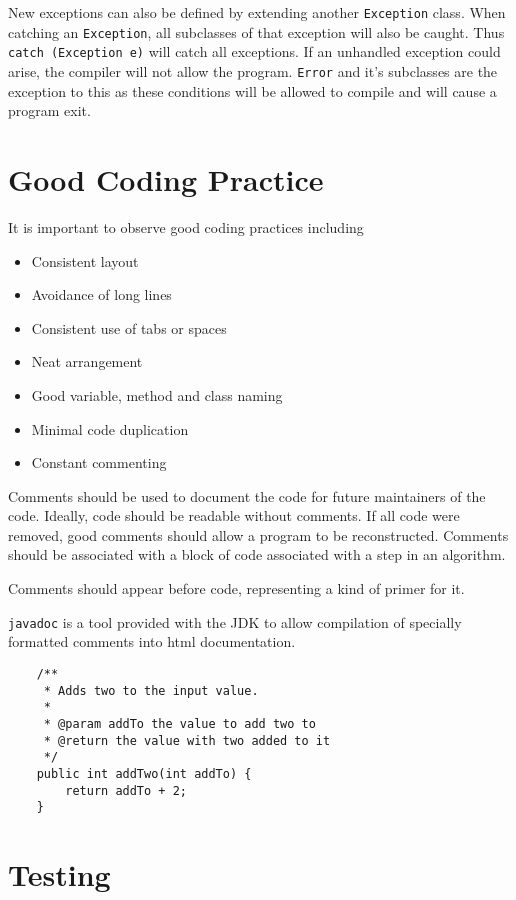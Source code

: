 \documentclass[12pt]{report}
\newcommand{\code}[1]{\lstinline{#1}}
\begin{document}
\begin{flushleft}
New exceptions can also be defined by extending another \code{Exception} class.
When catching an \code{Exception}, all subclasses of that exception will also
be caught. Thus \code{catch (Exception e)} will catch all exceptions. If an
unhandled exception could arise, the compiler will not allow the program.
\code{Error} and it's subclasses are the exception to this as these conditions
will be allowed to compile and will cause a program exit.

\section*{Good Coding Practice}

It is important to observe good coding practices including

\begin{itemize}
    \item Consistent layout
    \item Avoidance of long lines
    \item Consistent use of tabs or spaces
    \item Neat arrangement
    \item Good variable, method and class naming
    \item Minimal code duplication
    \item Constant commenting
\end{itemize}

Comments should be used to document the code for future maintainers of the
code. Ideally, code should be readable without comments. If all code were
removed, good comments should allow a program to be reconstructed. Comments
should be associated with a block of code associated with a step in an
algorithm. \par
Comments should appear before code, representing a kind of primer for it. \par
\code{javadoc} is a tool provided with the JDK to allow compilation of
specially formatted comments into html documentation.

\begin{lstlisting}
    /**
     * Adds two to the input value.
     *
     * @param addTo the value to add two to
     * @return the value with two added to it
     */
    public int addTwo(int addTo) {
        return addTo + 2;
    }
\end{lstlisting}

\section*{Testing}


\end{flushleft}
\end{document}
